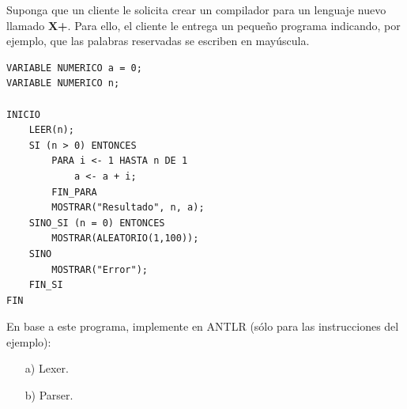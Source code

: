 \documentclass{exam}
\begin{document}
\noindent
Suponga que un cliente le solicita crear un compilador para un lenguaje nuevo llamado \textbf{X+}. Para ello, el cliente le entrega un peque\~no programa indicando, por ejemplo, que las palabras reservadas se escriben en may\'uscula.

\begin{verbatim}
VARIABLE NUMERICO a = 0;
VARIABLE NUMERICO n;

INICIO
    LEER(n);
    SI (n > 0) ENTONCES
        PARA i <- 1 HASTA n DE 1
            a <- a + i;
        FIN_PARA
        MOSTRAR("Resultado", n, a);
    SINO_SI (n = 0) ENTONCES
        MOSTRAR(ALEATORIO(1,100));
    SINO
        MOSTRAR("Error");
    FIN_SI
FIN
\end{verbatim}

En base a este programa, implemente en ANTLR (s\'olo para las instrucciones del ejemplo):

\begin{enumerate}
    \item[a)] Lexer.
    \item[b)] Parser.
\end{enumerate}
\end{document}

